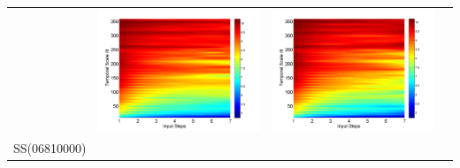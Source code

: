 \documentclass[draft,wrr]{AGUTeX}
\begin{document}
\begin{article}
\begin{table}[H]
\begin{tabular}{cccc}
&\begin{minipage}{.3\textwidth}\includegraphics[width=\linewidth]{resultgraph/11532500pep_abs.png}\end{minipage}
&\begin{minipage}{.3\textwidth}\includegraphics[width=\linewidth]{resultgraph/11532500pepq_abs.png}\end{minipage}
\\
SS(06810000)

\end{tabular}
\end{table}
\end{article}
\end{document}

